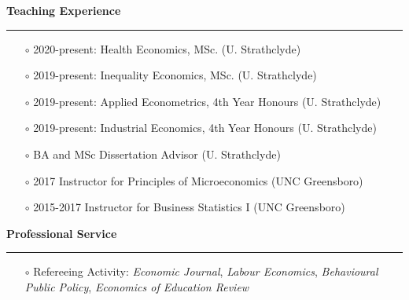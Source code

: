 \documentclass[12pt,a4paper]{article}
\begin{document}
	\bigskip	

	\noindent \textbf{\textsf{{\large Teaching Experience}}}	 \vspace{0.1cm} \hrule \vspace{0.2cm}	

		\begin{itemize}
		\item[$\circ$] 2020-present: Health Economics, MSc. (U. Strathclyde)
		\item[$\circ$] 2019-present: Inequality Economics, MSc. (U. Strathclyde)
		\item[$\circ$] 2019-present: Applied Econometrics, 4th Year Honours (U. Strathclyde)
		\item[$\circ$] 2019-present: Industrial Economics, 4th Year Honours (U. Strathclyde)
		\item[$\circ$] BA and MSc Dissertation Advisor (U. Strathclyde)
		\item[$\circ$] 2017 Instructor for Principles of Microeconomics  (UNC Greensboro)
		\item[$\circ$] 2015-2017 Instructor for Business Statistics I  (UNC Greensboro)
		\end{itemize}

	\bigskip
	
	\noindent \textbf{\textsf{{\large Professional Service}}}	 \vspace{0.1cm} \hrule \vspace{0.2cm}	

		\begin{itemize}
		\item[$\circ$] Refereeing Activity: \textit{Economic Journal}, \textit{Labour Economics}, \textit{Behavioural Public Policy}, \textit{Economics of Education Review}
		\end{itemize}

		
	
	
				
\end{document}
